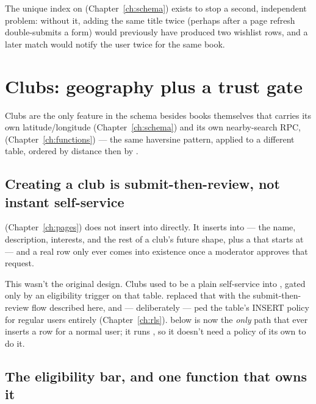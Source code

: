 The unique index on  (Chapter~\ref{ch:schema}) exists to stop a second, independent problem: without it, adding the same title twice (perhaps after a page refresh double-submits a form) would previously have produced two wishlist rows, and a later match would notify the user twice for the same book.

\section{Clubs: geography plus a trust gate}

Clubs are the only feature in the schema besides books themselves that carries its own latitude/longitude (Chapter~\ref{ch:schema}) and its own nearby-search RPC,  (Chapter~\ref{ch:functions}) — the same haversine pattern, applied to a different table, ordered by distance then by .

\subsection*{Creating a club is submit-then-review, not instant self-service}

 (Chapter~\ref{ch:pages}) does not insert into  directly. It inserts into  — the name, description, interests, and the rest of a club's future shape, plus a  that starts at  — and a real  row only ever comes into existence once a moderator approves that request.

\begin{olknote}
This wasn't the original design. Clubs used to be a plain self-service  into , gated only by an eligibility trigger on that table.  replaced that with the submit-then-review flow described here, and — deliberately — ped the  table's INSERT policy for regular users entirely (Chapter~\ref{ch:rls}).  below is now the \emph{only} path that ever inserts a  row for a normal user; it runs , so it doesn't need a policy of its own to do it.
\end{olknote}

\subsection*{The eligibility bar, and one function that owns it}

